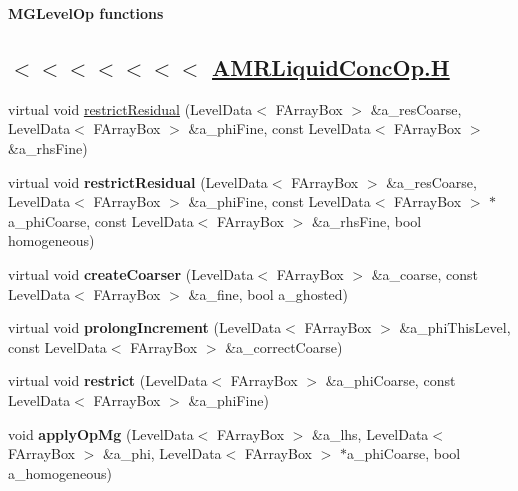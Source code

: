 \begin{Indent}{\bf M\-G\-Level\-Op functions}\par
{\em \subsection*{$<$$<$$<$$<$$<$$<$$<$ \hyperlink{_a_m_r_liquid_conc_op_8_h_source}{A\-M\-R\-Liquid\-Conc\-Op.\-H} }}\begin{DoxyCompactItemize}
\item 
virtual void \hyperlink{class_a_m_r_liquid_conc_op_abe201b8d92894a115defe7acbdeb1bff}{restrict\-Residual} (Level\-Data$<$ F\-Array\-Box $>$ \&a\-\_\-res\-Coarse, Level\-Data$<$ F\-Array\-Box $>$ \&a\-\_\-phi\-Fine, const Level\-Data$<$ F\-Array\-Box $>$ \&a\-\_\-rhs\-Fine)
\item 
\hypertarget{class_a_m_r_liquid_conc_op_a9f16ab36633cd4270b9c816883a8e34e}{virtual void {\bfseries restrict\-Residual} (Level\-Data$<$ F\-Array\-Box $>$ \&a\-\_\-res\-Coarse, Level\-Data$<$ F\-Array\-Box $>$ \&a\-\_\-phi\-Fine, const Level\-Data$<$ F\-Array\-Box $>$ $\ast$a\-\_\-phi\-Coarse, const Level\-Data$<$ F\-Array\-Box $>$ \&a\-\_\-rhs\-Fine, bool homogeneous)}\label{class_a_m_r_liquid_conc_op_a9f16ab36633cd4270b9c816883a8e34e}

\item 
\hypertarget{class_a_m_r_liquid_conc_op_ab32e1f773c24a6f2d71008af8918ebf0}{virtual void {\bfseries create\-Coarser} (Level\-Data$<$ F\-Array\-Box $>$ \&a\-\_\-coarse, const Level\-Data$<$ F\-Array\-Box $>$ \&a\-\_\-fine, bool a\-\_\-ghosted)}\label{class_a_m_r_liquid_conc_op_ab32e1f773c24a6f2d71008af8918ebf0}

\item 
\hypertarget{class_a_m_r_liquid_conc_op_a30428f52cabe4ed82de2f015289b8f35}{virtual void {\bfseries prolong\-Increment} (Level\-Data$<$ F\-Array\-Box $>$ \&a\-\_\-phi\-This\-Level, const Level\-Data$<$ F\-Array\-Box $>$ \&a\-\_\-correct\-Coarse)}\label{class_a_m_r_liquid_conc_op_a30428f52cabe4ed82de2f015289b8f35}

\item 
\hypertarget{class_a_m_r_liquid_conc_op_ac463958f3435a505bde57a13424e5ef0}{virtual void {\bfseries restrict} (Level\-Data$<$ F\-Array\-Box $>$ \&a\-\_\-phi\-Coarse, const Level\-Data$<$ F\-Array\-Box $>$ \&a\-\_\-phi\-Fine)}\label{class_a_m_r_liquid_conc_op_ac463958f3435a505bde57a13424e5ef0}

\item 
\hypertarget{class_a_m_r_liquid_conc_op_ac8033a4c0e847dbf584e0dd6c9b17130}{void {\bfseries apply\-Op\-Mg} (Level\-Data$<$ F\-Array\-Box $>$ \&a\-\_\-lhs, Level\-Data$<$ F\-Array\-Box $>$ \&a\-\_\-phi, Level\-Data$<$ F\-Array\-Box $>$ $\ast$a\-\_\-phi\-Coarse, bool a\-\_\-homogeneous)}\label{class_a_m_r_liquid_conc_op_ac8033a4c0e847dbf584e0dd6c9b17130}

\end{DoxyCompactItemize}
\end{Indent}
